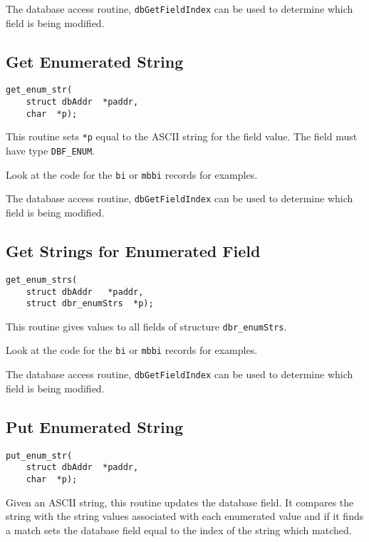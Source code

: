 The database access routine, \verb|dbGetFieldIndex| can be used to determine which field is being modified.

\subsection{Get Enumerated String}

\begin{verbatim}
get_enum_str(
    struct dbAddr  *paddr,
    char  *p);
\end{verbatim}This routine sets \verb|*p| equal to the ASCII string for the field value. The field must have type \verb|DBF_ENUM|.

Look at the code for the \verb|bi| or \verb|mbbi| records for examples.

The database access routine, \verb|dbGetFieldIndex| can be used to determine which field is being modified.

\subsection{Get Strings for Enumerated Field}

\begin{verbatim}
get_enum_strs(
    struct dbAddr   *paddr,
    struct dbr_enumStrs  *p);
\end{verbatim}This routine gives values to all fields of structure \verb|dbr_enumStrs|.

Look at the code for the \verb|bi| or \verb|mbbi| records for examples.

The database access routine, \verb|dbGetFieldIndex| can be used to determine which field is being modified.

\subsection{Put Enumerated String}

\begin{verbatim}
put_enum_str(
    struct dbAddr  *paddr,
    char  *p);
\end{verbatim}Given an ASCII string, this routine updates the database field. It compares the string with the string values associated with 
each enumerated value and if it finds a match sets the database field equal to the index of the string which matched.

